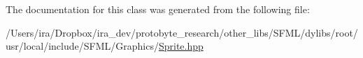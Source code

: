 The documentation for this class was generated from the following file\-:\begin{DoxyCompactItemize}
\item 
/\-Users/ira/\-Dropbox/ira\-\_\-dev/protobyte\-\_\-research/other\-\_\-libs/\-S\-F\-M\-L/dylibs/root/usr/local/include/\-S\-F\-M\-L/\-Graphics/\hyperlink{_sprite_8hpp}{Sprite.\-hpp}\end{DoxyCompactItemize}
